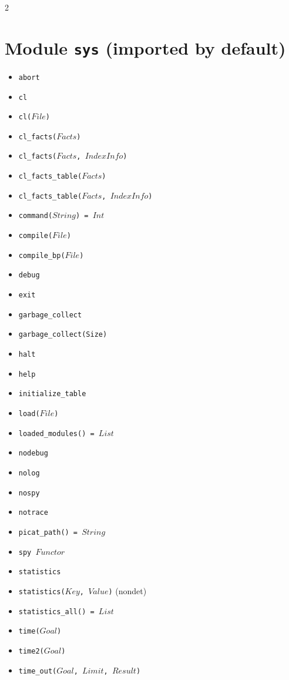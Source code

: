 \documentclass[10pt]{article}
\begin{document}
\begin{multicols}{2}
\section*{Module \texttt{sys} (imported by default)}
\begin{scriptsize}
\begin{itemize}
    \item \texttt{abort}
    \item \texttt{cl}
    \item \texttt{cl($File$)}
    \item \texttt{cl\_facts($Facts$)}
    \item \texttt{cl\_facts($Facts$, $IndexInfo$)}    
    \item \texttt{cl\_facts\_table($Facts$)}
    \item \texttt{cl\_facts\_table($Facts$, $IndexInfo$)}
    \item \texttt{command($String$) = $Int$}
    \item \texttt{compile($File$)}
    \item \texttt{compile\_bp($File$)}
    \item \texttt{debug}
    \item \texttt{exit} 
    \item \texttt{garbage\_collect} 
    \item \texttt{garbage\_collect(Size)} 
    \item \texttt{halt} 
    \item \texttt{help} 
    \item \texttt{initialize\_table}
    \item \texttt{load($File$)}
    \item \texttt{loaded\_modules() = $List$}
    \item \texttt{nodebug}
    \item \texttt{nolog}
    \item \texttt{nospy}
    \item \texttt{notrace}
    \item \texttt{picat\_path() = $String$}
    \item \texttt{spy $Functor$}
    \item \texttt{statistics}
    \item \texttt{statistics($Key$, $Value$)} (nondet)
    \item \texttt{statistics\_all() = $List$}    
    \item \texttt{time($Goal$)}
    \item \texttt{time2($Goal$)} 
    \item \texttt{time\_out($Goal$, $Limit$, $Result$)}

\end{itemize}
\end{scriptsize}
\end{multicols}
\end{document}
